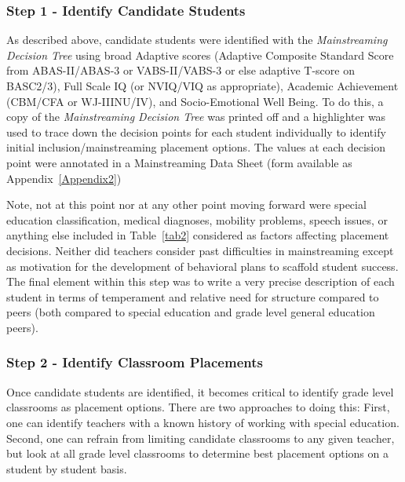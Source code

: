 \documentclass[twoside]{article}
\begin{document}
\subsubsection{Step 1 - Identify Candidate Students}
As described above, candidate students were identified with the \textit{Mainstreaming Decision Tree} using broad Adaptive scores (Adaptive Composite Standard Score from ABAS-II/ABAS-3 or VABS-II/VABS-3 or else adaptive T-score on BASC2/3), Full Scale IQ (or NVIQ/VIQ as appropriate), Academic Achievement (CBM/CFA or WJ-IIINU/IV), and Socio-Emotional Well Being. To do this, a copy of the \textit{Mainstreaming Decision Tree} was printed off and a highlighter was used to trace down the decision points for each student individually to identify initial inclusion/mainstreaming placement options. The values at each decision point were annotated in a Mainstreaming Data Sheet (form available as Appendix~\ref{Appendix2})

Note, not at this point nor at any other point moving forward were special education classification, medical diagnoses, mobility problems, speech issues, or anything else included in Table~\ref{tab2} considered as factors affecting placement decisions. Neither did teachers consider past difficulties in mainstreaming except as motivation for the development of behavioral plans to scaffold student success. The final element within this step was to write a very precise description of each student in terms of temperament and relative need for structure compared to peers (both compared to special education and grade level general education peers).

\subsubsection{Step 2 - Identify Classroom Placements}
Once candidate students are identified, it becomes critical to identify grade level classrooms as placement options. There are two approaches to doing this: First, one can identify teachers with a known history of working with special education. Second, one can refrain from limiting candidate classrooms to any given teacher, but look at all grade level classrooms to determine best placement options on a student by student basis.
\end{document}

